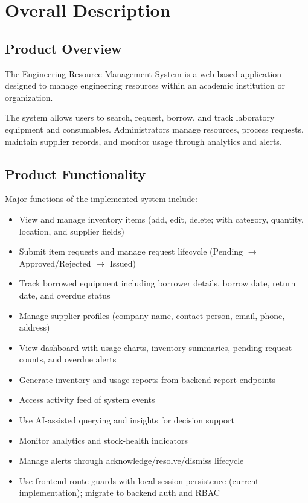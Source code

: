 \documentclass[12pt]{article}
\begin{document}
\section{Overall Description}

\subsection{Product Overview}

The Engineering Resource Management System is a web-based application designed to manage engineering resources within an academic institution or organization.

The system allows users to search, request, borrow, and track laboratory equipment and consumables. Administrators manage resources, process requests, maintain supplier records, and monitor usage through analytics and alerts.

\subsection{Product Functionality}

Major functions of the implemented system include:

\begin{itemize}
\item View and manage inventory items (add, edit, delete; with category, quantity, location, and supplier fields)
\item Submit item requests and manage request lifecycle (Pending $\rightarrow$ Approved/Rejected $\rightarrow$ Issued)
\item Track borrowed equipment including borrower details, borrow date, return date, and overdue status
\item Manage supplier profiles (company name, contact person, email, phone, address)
\item View dashboard with usage charts, inventory summaries, pending request counts, and overdue alerts
\item Generate inventory and usage reports from backend report endpoints
\item Access activity feed of system events
\item Use AI-assisted querying and insights for decision support
\item Monitor analytics and stock-health indicators
\item Manage alerts through acknowledge/resolve/dismiss lifecycle
\item Use frontend route guards with local session persistence (current implementation); migrate to backend auth and RBAC
\end{itemize}
\end{document}

